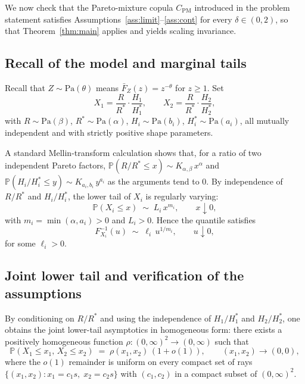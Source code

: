 \documentclass[11pt]{article}
\theoremstyle{definition}
\newcommand{\PM}{\mathrm{PM}}
\newcommand{\Pa}{\mathrm{Pa}}
\newcommand{\Prob}{\mathbb{P}}
\begin{document}
We now check that the Pareto-mixture copula $C_{\PM}$ introduced in the
problem statement satisfies
Assumptions~\ref{ass:limit}--\ref{ass:cont} for every $\delta\in(0,2)$,
so that Theorem~\ref{thm:main} applies and yields scaling invariance.

\subsection{Recall of the model and marginal tails}

Recall that $Z\sim\Pa(\theta)$ means $\bar F_Z(z)=z^{-\theta}$ for
$z\ge 1$. Set
\[
X_1=\frac{R}{R^*}\cdot\frac{H_1}{H_1^*},\qquad
X_2=\frac{R}{R^*}\cdot\frac{H_2}{H_2^*},
\]
with $R\sim\Pa(\beta)$, $R^*\sim\Pa(\alpha)$, $H_i\sim\Pa(b_i)$,
$H_i^*\sim\Pa(a_i)$, all mutually independent and with strictly
positive shape parameters.

A standard Mellin-transform calculation shows that, for a ratio of two
independent Pareto factors, $\Prob(R/R^*\le x)\sim K_{\alpha,\beta}\,x^{\alpha}$ and
$\Prob(H_i/H_i^*\le y)\sim K_{a_i,b_i}\,y^{a_i}$ as the arguments tend to
$0$. By independence of $R/R^*$ and $H_i/H_i^*$, the lower tail of
$X_i$ is regularly varying:
\begin{equation}\label{eq:marginal}
\Prob(X_i\le x)\;\sim\; L_i\,x^{m_i}, \qquad x\downarrow 0,
\end{equation}
with $m_i=\min(\alpha,a_i)>0$ and $L_i>0$. Hence the quantile satisfies
\begin{equation}\label{eq:quantile}
F_{X_i}^{-1}(u)\;\sim\;\ell_i\,u^{1/m_i}, \qquad u\downarrow 0,
\end{equation}
for some $\ell_i>0$.

\subsection{Joint lower tail and verification of the assumptions}

By conditioning on $R/R^*$ and using the independence of $H_1/H_1^*$
and $H_2/H_2^*$, one obtains the joint lower-tail asymptotics in
homogeneous form: there exists a positively homogeneous function
$\rho:(0,\infty)^2\to(0,\infty)$ such that
\begin{equation}\label{eq:joint-rv}
\Prob(X_1\le x_1,\,X_2\le x_2)
\;=\;\rho(x_1,x_2)\,(1+o(1)),
\qquad (x_1,x_2)\to(0,0),
\end{equation}
where the $o(1)$ remainder is uniform on every compact set
of rays $\{(x_1,x_2):x_1=c_1 s,\;x_2=c_2 s\}$ with $(c_1,c_2)$ in a
compact subset of $(0,\infty)^2$.
\end{document}
